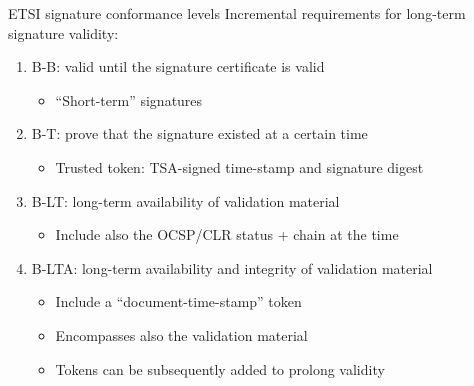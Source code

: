 \begin{frame}{ETSI signature conformance levels}
  Incremental requirements for long-term signature validity:
  \begin{enumerate}[<+(1)->]
    \item B-B: valid until the signature certificate is valid
    \begin{itemize}
      \item \enquote{Short-term} signatures
    \end{itemize}
    \item B-T: prove that the signature existed at a certain time
    \begin{itemize}
      \item Trusted token: TSA-signed time-stamp and signature digest
    \end{itemize}
    \item B-LT: long-term availability of validation material
    \begin{itemize}
      \item Include also the OCSP/CLR status + chain at the time
    \end{itemize}
    \item B-LTA: long-term availability and integrity of validation material
    \begin{itemize}
      \item Include a \enquote{document-time-stamp} token
      \item Encompasses also the validation material
      \item Tokens can be subsequently added to prolong validity
    \end{itemize}
  \end{enumerate}
\end{frame}


